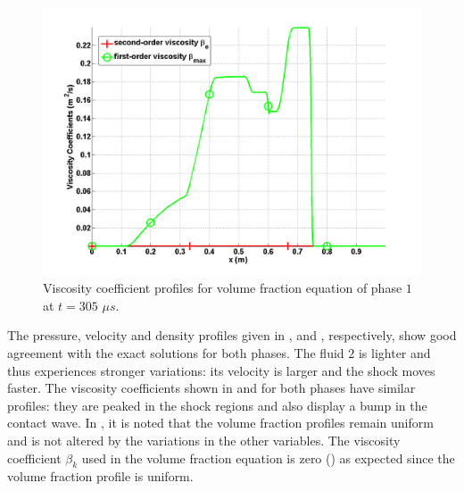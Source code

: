 \begin{figure}[H]
\centering
\includegraphics[width=\textwidth]{figures/SEM/two_phases_liquid_beta.png}
\caption{Viscosity coefficient profiles for volume fraction equation of phase $1$ at $t=305$ $\mu s$.}
\label{fig:two-indep-fluids-vf-visc-1-7-eqn-sect4}
\end{figure}
%
The pressure, velocity and density profiles given in ,  and , respectively, show good agreement with the exact solutions for both phases. The fluid $2$ is lighter and thus experiences stronger variations: its velocity is larger and the shock moves faster. The viscosity coefficients shown in  and  for both phases have similar profiles: they are peaked in the shock regions and also display a bump in the contact wave. In , it is noted that the volume fraction profiles remain uniform and is not altered by the variations in the other variables. The viscosity coefficient $\beta_k$ used in the volume fraction equation is zero () as expected since the volume fraction profile is uniform. 
